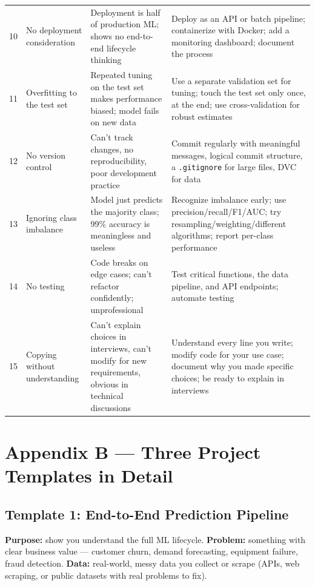 \begin{longtable}{p{} p{} p{} p{}}
10 & No deployment consideration & Deployment is half of production ML; shows no end-to-end lifecycle thinking &
Deploy as an API or batch pipeline; containerize with Docker; add a monitoring dashboard; document the process \\
11 & Overfitting to the test set & Repeated tuning on the test set makes performance biased; model fails on new
data & Use a separate validation set for tuning; touch the test set only once, at the end; use cross-validation
for robust estimates \\
12 & No version control & Can't track changes, no reproducibility, poor development practice & Commit regularly
with meaningful messages, logical commit structure, a \texttt{.gitignore} for large files, DVC for data \\
13 & Ignoring class imbalance & Model just predicts the majority class; 99\% accuracy is meaningless and useless &
Recognize imbalance early; use precision/recall/F1/AUC; try resampling/weighting/different algorithms; report
per-class performance \\
14 & No testing & Code breaks on edge cases; can't refactor confidently; unprofessional & Test critical functions,
the data pipeline, and API endpoints; automate testing \\
15 & Copying without understanding & Can't explain choices in interviews, can't modify for new requirements,
obvious in technical discussions & Understand every line you write; modify code for your use case; document why
you made specific choices; be ready to explain in interviews \\
\bottomrule
\end{longtable}

\section{Appendix B --- Three Project Templates in Detail}
\label{app:templates}

\subsection{Template 1: End-to-End Prediction Pipeline}
\textbf{Purpose:} show you understand the full ML lifecycle. \textbf{Problem:} something with clear business
value --- customer churn, demand forecasting, equipment failure, fraud detection. \textbf{Data:} real-world,
messy data you collect or scrape (APIs, web scraping, or public datasets with real problems to fix).

